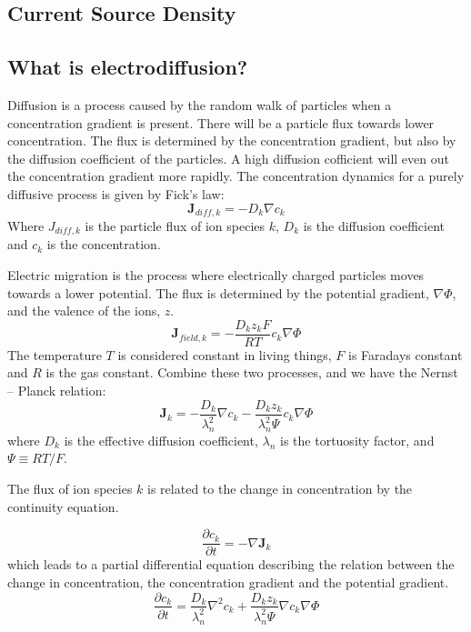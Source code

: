 \documentclass{article}
\begin{document}
\subsection{Current Source Density}

\subsection{What is electrodiffusion?}

Diffusion is a process caused by the random walk of particles when a concentration gradient is present. There will be a particle flux towards lower concentration. The flux is determined by the concentration gradient, but also by the diffusion coefficient of the particles. A high diffusion cofficient will even out the concentration gradient more rapidly. The concentration dynamics for a purely diffusive process is given by Fick's law:
\begin{equation}\label{eq:diff}
 \bm{J}_{diff,k} = - D_k\nabla c_k
\end{equation}
Where  $J_{diff,k}$ is the particle flux of ion species $k$, $D_k$ is the diffusion coefficient and $c_k$ is the concentration.

Electric migration is the process where electrically charged particles moves towards a lower potential. The flux is determined by the potential gradient, $\nabla \Phi$,  and the valence of the ions, $z$. 
\begin{equation}
\bm{J}_{field,k} = -\frac{D_kz_kF}{RT} c_k\nabla \Phi
\end{equation}
The temperature $T$ is considered constant in living things, $F$ is Faradays constant and $R$ is the gas constant. Combine these two processes, and we have the Nernst -- Planck relation:
 \begin{equation}\label{eq:nernst-planck}
\bm{J}_k = -\frac{D_k}{\lambda_n^2}\nabla c_k -\frac{D_k z_k}{\lambda_n^2 \Psi}c_k  \nabla \Phi
\end{equation}
where $D_k$ is the effective diffusion coefficient, $\lambda_n$ is the tortuosity factor, and $\Psi \equiv RT/F$.

The flux  of ion species $k$ is related to the change in concentration by the continuity equation. 

\begin{equation}
\frac{\partial c_k}{\partial t} = -\nabla \bm{J}_k
\end{equation}
which leads to a partial differential equation describing the relation between the change in concentration, the concentration gradient and the potential gradient.
 \begin{equation}\label{eq:el-diff}
\frac{\partial c_k}{\partial t}  = \frac{D_k}{\lambda_n^2}\nabla^2 c_k +\frac{D_k z_k}{\lambda_n^2 \Psi}\nabla c_k  \nabla \Phi
\end{equation}
\end{document}
